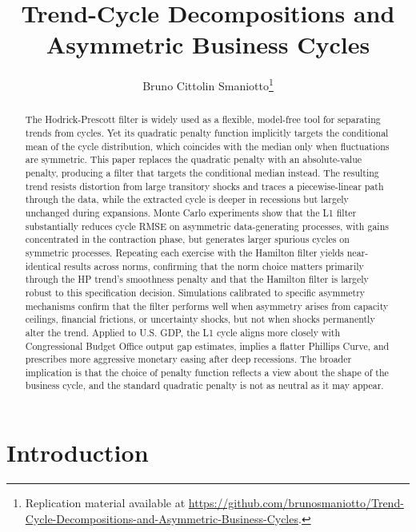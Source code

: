 \documentclass[10pt]{article}
\author{Bruno Cittolin Smaniotto\thanks{Replication material available at \url{https://github.com/brunosmaniotto/Trend-Cycle-Decompositions-and-Asymmetric-Business-Cycles}.}}
\date{}
\begin{document}
\title{Trend-Cycle Decompositions and Asymmetric Business Cycles}

\maketitle

\begin{abstract}

The Hodrick-Prescott filter is widely used as a flexible, model-free tool for separating trends from cycles. Yet its quadratic penalty function implicitly targets the conditional mean of the cycle distribution, which coincides with the median only when fluctuations are symmetric. This paper replaces the quadratic penalty with an absolute-value penalty, producing a filter that targets the conditional median instead. The resulting trend resists distortion from large transitory shocks and traces a piecewise-linear path through the data, while the extracted cycle is deeper in recessions but largely unchanged during expansions. Monte Carlo experiments show that the L1 filter substantially reduces cycle RMSE on asymmetric data-generating processes, with gains concentrated in the contraction phase, but generates larger spurious cycles on symmetric processes. Repeating each exercise with the Hamilton filter yields near-identical results across norms, confirming that the norm choice matters primarily through the HP trend's smoothness penalty and that the Hamilton filter is largely robust to this specification decision. Simulations calibrated to specific asymmetry mechanisms confirm that the filter performs well when asymmetry arises from capacity ceilings, financial frictions, or uncertainty shocks, but not when shocks permanently alter the trend. Applied to U.S. GDP, the L1 cycle aligns more closely with Congressional Budget Office output gap estimates, implies a flatter Phillips Curve, and prescribes more aggressive monetary easing after deep recessions. The broader implication is that the choice of penalty function reflects a view about the shape of the business cycle, and the standard quadratic penalty is not as neutral as it may appear.

\end{abstract}

\newpage


\section{Introduction}
\label{sec:introduction}
\end{document}
